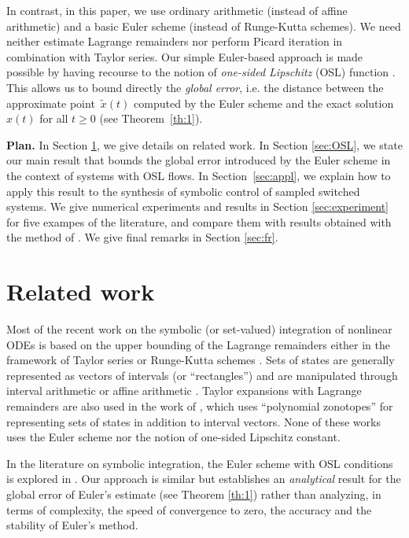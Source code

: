 In contrast, in this paper, we use ordinary arithmetic
(instead of affine arithmetic)
and a basic Euler scheme (instead of Runge-Kutta schemes). We
need neither estimate Lagrange remainders nor perform Picard iteration
in combination with Taylor series.
Our simple Euler-based approach is made possible  by having 
recourse to the notion of {\em one-sided Lipschitz} (OSL) function
\cite{Donchev98}.
This allows us to bound directly the {\em global error},
i.e. the distance between the approximate point~$\tilde{x}(t)$
computed by the Euler scheme
and the exact solution $x(t)$ for all $t\geq 0$
(see Theorem~\ref{th:1}).

{\bf Plan.}
In Section \ref{sec:rw}, we give  details on related work.
In Section \ref{sec:OSL}, we state our main result that bounds
the global error introduced by the Euler scheme in the context of systems
with OSL flows.
In Section~\ref{sec:appl}, we explain how to apply this result
to the synthesis of symbolic control of sampled switched systems.
We give numerical experiments and results
in Section \ref{sec:experiment} for five exampes of the literature,
and compare them with results obtained with the method of \cite{NL_minimator}.
We give final remarks in Section \ref{sec:fr}.
\section{Related work}\label{sec:rw}

Most of the recent work on the symbolic (or set-valued) integration of nonlinear ODEs is based
on the upper bounding of the Lagrange remainders either in the framework of 
Taylor series or Runge-Kutta schemes 
\cite{Althoff2013a,BCD13,BMC12,CAS12,chen2013flow,NL_minimator,Makino2009,report,dit2016validated}.
Sets of states are generally represented as vectors of intervals 
(or ``rectangles'')
and are manipulated  through interval arithmetic \cite{Moore66}
or affine arithmetic \cite{AffineA97}.
%
Taylor expansions with Lagrange remainders are also used in the work
of \cite{Althoff2013a}, which uses ``polynomial zonotopes'' 
for representing sets of states in addition to interval vectors.
%
None of these works uses
the Euler scheme nor the notion of one-sided Lipschitz constant.

In the literature on symbolic integration, the Euler scheme with OSL conditions
is explored in \cite{Donchev98,Lempio95}.
%
Our approach is similar but establishes an {\em analytical} result for the global error of Euler's estimate
(see Theorem \ref{th:1}) rather than analyzing, in terms of complexity,
the speed of convergence to zero, the accuracy and the stability of Euler's method.

